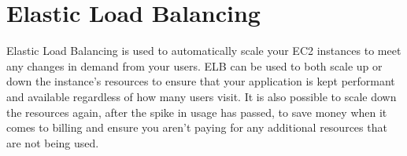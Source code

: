 \chapter{Elastic Load Balancing}\label{ch:elastic-load-balancing}
Elastic Load Balancing is used to automatically scale your EC2 instances to meet any changes in demand from your users. ELB can be used to both scale up or down the instance's resources to ensure that your application is kept performant and available regardless of how many users visit. It is also possible to scale down the resources again, after the spike in usage has passed, to save money when it comes to billing and ensure you aren't paying for any additional resources that are not being used.